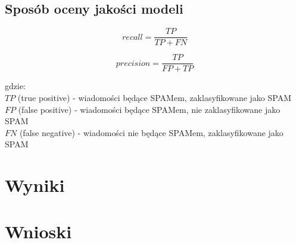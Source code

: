 \documentclass[a4paper, 10pt]{article}
\begin{document}
	\subsection{Sposób oceny jakości modeli}
\begin{equation}
recall = \frac{TP}{TP + FN}
\end{equation}

\begin{equation}
precision = \frac{TP}{FP + TP}
\end{equation}

gdzie:\\
$TP$ (true positive) - wiadomości będące SPAMem, zaklasyfikowane jako SPAM\\
$FP$ (false positive) - wiadomości będące SPAMem, nie zaklasyfikowane jako SPAM\\
$FN$ (false negative) - wiadomości nie będące SPAMem, zaklasyfikowane jako SPAM\\



\section{Wyniki}
\section{Wnioski}







\nocite{*}

\end{document}
